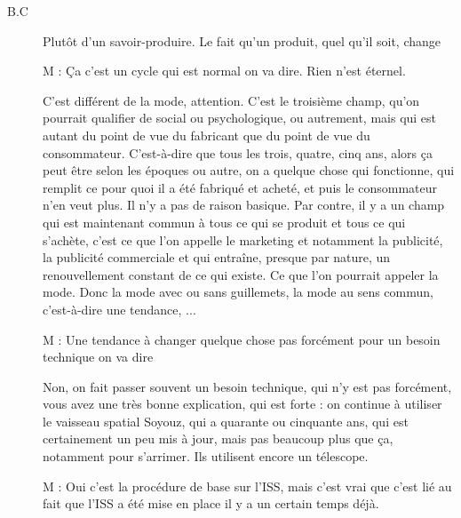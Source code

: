 \begin{description}
\item[B.C] Plutôt d'un savoir-produire. Le fait qu'un produit, quel qu'il soit, change

M : Ça c'est un cycle qui est normal on va dire. Rien n'est éternel.

\vspace{1\baselineskip}

C'est différent de la mode, attention. C'est le troisième champ, qu'on pourrait qualifier de social ou psychologique, ou autrement, mais qui est autant du point de vue du fabricant que du point de vue du consommateur. C'est-à-dire que tous les trois, quatre, cinq ans, alors ça peut être selon les époques ou autre, on a quelque chose qui fonctionne, qui remplit ce pour quoi il a été fabriqué et acheté, et puis le consommateur n'en veut plus. Il n'y a pas de raison basique.
Par contre, il y a un champ qui est maintenant commun à tous ce qui se produit et tous ce qui s'achète, c'est ce que l'on appelle le marketing et notamment la publicité, la publicité commerciale et qui entraîne, presque par nature, un renouvellement constant de ce qui existe. Ce que l'on pourrait appeler la mode. Donc la mode avec ou sans guillemets, la mode au sens commun, c'est-à-dire une tendance, ...


\vspace{1\baselineskip}

M : Une tendance à changer quelque chose pas forcément pour un besoin technique on va dire


\vspace{1\baselineskip}

Non, on fait passer souvent un besoin technique, qui n'y est pas forcément, vous avez une très bonne explication, qui est forte : on continue à utiliser le vaisseau spatial Soyouz, qui a quarante ou cinquante ans, qui est certainement un peu mis à jour, mais pas beaucoup plus que ça, notamment pour s'arrimer. Ils utilisent encore un télescope.

\vspace{1\baselineskip}

M : Oui c'est la procédure de base sur l'ISS, mais c'est vrai que c'est lié au fait que l'ISS a été mise en place il y a un certain temps déjà.

\vspace{1\baselineskip}


\end{description}
